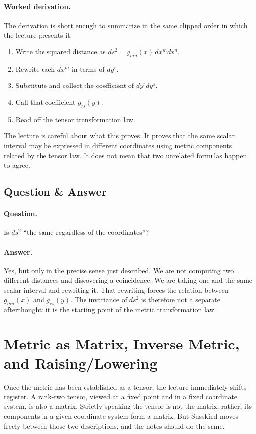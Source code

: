 \paragraph{Worked derivation.} The derivation is short enough to summarize in the same clipped order in which the lecture presents it:
\begin{enumerate}
\item Write the squared distance as \(ds^2=g_{mn}(x)\,dx^m dx^n\).
\item Rewrite each \(dx^m\) in terms of \(dy^r\).
\item Substitute and collect the coefficient of \(dy^r dy^s\).
\item Call that coefficient \(g_{rs}(y)\).
\item Read off the tensor transformation law.
\end{enumerate}

The lecture is careful about what this proves. It proves that the same scalar interval may be expressed in different coordinates using metric components related by the tensor law. It does not mean that two unrelated formulas happen to agree.

\subsection{Question \& Answer}

\paragraph{Question.} Is \(ds^2\) ``the same regardless of the coordinates''?

\paragraph{Answer.} Yes, but only in the precise sense just described. We are not computing two different distances and discovering a coincidence. We are taking one and the same scalar interval and rewriting it. That rewriting forces the relation between \(g_{mn}(x)\) and \(g_{rs}(y)\). The invariance of \(ds^2\) is therefore not a separate afterthought; it is the starting point of the metric transformation law.

\section{Metric as Matrix, Inverse Metric, and Raising/Lowering}

Once the metric has been established as a tensor, the lecture immediately shifts register. A rank-two tensor, viewed at a fixed point and in a fixed coordinate system, is also a matrix. Strictly speaking the tensor is not the matrix; rather, its components in a given coordinate system form a matrix. But Susskind moves freely between those two descriptions, and the notes should do the same.

